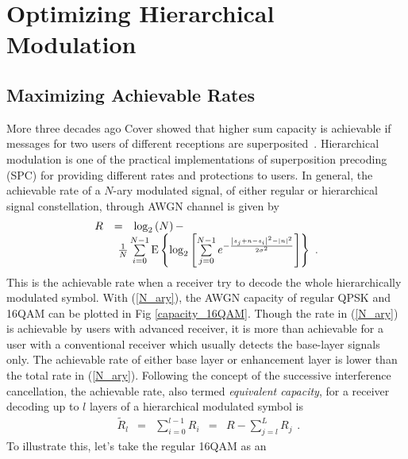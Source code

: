 \documentclass[10pt,fleqn, twocolumn]{IEEEtran}
\begin{document}
\section{Optimizing Hierarchical Modulation}

\subsection{Maximizing Achievable Rates~\label{Info_Theory}}

More three decades ago Cover showed that higher sum capacity is
achievable if messages for two users of different receptions are
superposited~\cite{Cover72}. Hierarchical modulation is one of the
practical implementations of superposition precoding (SPC) for
providing different rates and protections to users. In general,
the achievable rate of a $N$-ary modulated signal, of either
regular or hierarchical signal constellation, through AWGN channel
is given by~\cite{Unge82}
\begin{equation}
\begin{array}{lcl}
R&=&\log_{2}\left(N\right)-\\
&&\hspace{-0.20in}\frac{1}{N}\sum\limits_{i=0}^{N-1}\mbox{E}\left\{\log_{2}\left[\sum\limits_{j=0}^{N-1}e^{-\frac{\left|s_{j}+n-s_{i}\right|^2-\left|n\right|^2}{2\sigma^2}}\right]\right\}\
.
\end{array}\label{N_ary}
\end{equation}
\noindent This is the achievable rate when a receiver try to
decode the whole hierarchically modulated symbol. With
(\ref{N_ary}), the AWGN capacity of regular QPSK and 16QAM can be
plotted in Fig \ref{capacity_16QAM}. Though the rate in
(\ref{N_ary}) is achievable by users with advanced receiver, it is
more than achievable for a user with a conventional receiver which
usually detects the base-layer signals only. The achievable rate
of either base layer or enhancement layer is lower than the total
rate in (\ref{N_ary}). Following the concept of the successive
interference cancellation, the achievable rate, also termed {\em
equivalent capacity}, for a receiver decoding up to $l$ layers of
a hierarchical modulated symbol is~\cite{Huber94}
\begin{equation}
\begin{array}{rcccl}
\tilde{R}_{l}&=&\sum\limits_{i=0}^{l-1}R_{i}& = &
R-\sum\limits_{j=l}^{L}{R}_{j}
\end{array}.\label{R_equiv}
\end{equation}
\noindent To illustrate this, let's take the regular 16QAM as an
\end{document}
